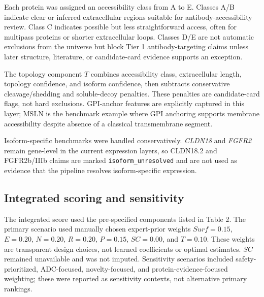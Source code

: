 \documentclass[review,12pt,authoryear]{elsarticle}
\begin{document}
Each protein was assigned an accessibility class from A to E. Classes A/\allowbreak{}B indicate clear or inferred extracellular regions suitable for antibody-accessibility review. Class C indicates possible but less straightforward access, often for multipass proteins or shorter extracellular loops. Classes D/\allowbreak{}E are not automatic exclusions from the universe but block Tier 1 antibody-targeting claims unless later structure, literature, or candidate-card evidence supports an exception.

The topology component $T$ combines accessibility class, extracellular length, topology confidence, and isoform confidence, then subtracts conservative cleavage/\allowbreak{}shedding and soluble-decoy penalties. These penalties are candidate-card flags, not hard exclusions. GPI-anchor features are explicitly captured in this layer;\allowbreak{} MSLN is the benchmark example where GPI anchoring supports membrane accessibility despite absence of a classical transmembrane segment.

Isoform-specific benchmarks were handled conservatively. \textit{CLDN18} and \textit{FGFR2} remain gene-level in the current expression layers, so CLDN18.2 and FGFR2b/\allowbreak{}IIIb claims are marked \texttt{isoform\_\allowbreak{}unresolved} and are not used as evidence that the pipeline resolves isoform-specific expression.

\subsection{Integrated scoring and sensitivity}

The integrated score used the pre-specified components listed in Table 2. The primary scenario used manually chosen expert-prior weights $Surf=0.15$, $E=0.20$, $N=0.20$, $R=0.20$, $P=0.15$, $SC=0.00$, and $T=0.10$. These weights are transparent design choices, not learned coefficients or optimal estimates. $SC$ remained unavailable and was not imputed. Sensitivity scenarios included safety-prioritized, ADC-focused, novelty-focused, and protein-evidence-focused weighting;\allowbreak{} these were reported as sensitivity contexts, not alternative primary rankings.
\end{document}
